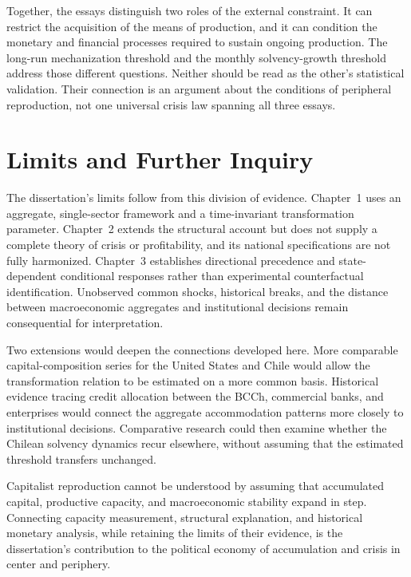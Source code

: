 Together, the essays distinguish two roles of the external constraint. It can restrict the acquisition of the means of production, and it can condition the monetary and financial processes required to sustain ongoing production. The long-run mechanization threshold and the monthly solvency-growth threshold address those different questions. Neither should be read as the other's statistical validation. Their connection is an argument about the conditions of peripheral reproduction, not one universal crisis law spanning all three essays.

\section*{Limits and Further Inquiry}

The dissertation's limits follow from this division of evidence. Chapter~1 uses an aggregate, single-sector framework and a time-invariant transformation parameter. Chapter~2 extends the structural account but does not supply a complete theory of crisis or profitability, and its national specifications are not fully harmonized. Chapter~3 establishes directional precedence and state-dependent conditional responses rather than experimental counterfactual identification. Unobserved common shocks, historical breaks, and the distance between macroeconomic aggregates and institutional decisions remain consequential for interpretation.

Two extensions would deepen the connections developed here. More comparable capital-composition series for the United States and Chile would allow the transformation relation to be estimated on a more common basis. Historical evidence tracing credit allocation between the BCCh, commercial banks, and enterprises would connect the aggregate accommodation patterns more closely to institutional decisions. Comparative research could then examine whether the Chilean solvency dynamics recur elsewhere, without assuming that the estimated threshold transfers unchanged.

Capitalist reproduction cannot be understood by assuming that accumulated capital, productive capacity, and macroeconomic stability expand in step. Connecting capacity measurement, structural explanation, and historical monetary analysis, while retaining the limits of their evidence, is the dissertation's contribution to the political economy of accumulation and crisis in center and periphery.

